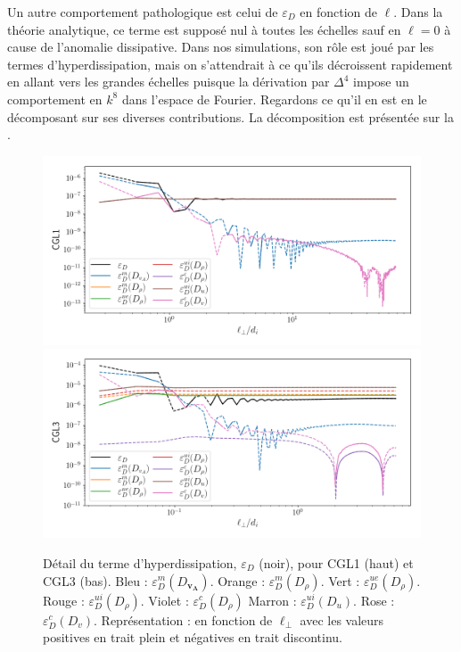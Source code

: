    Un autre comportement pathologique est celui de $\varepsilon_{D}$ en fonction de $\ell$. Dans la théorie analytique, ce terme est supposé nul à toutes les échelles sauf en $\ell = 0$ à cause de l'anomalie dissipative. Dans nos simulations, son rôle est joué par les termes d'hyperdissipation, mais on s'attendrait à ce qu'ils décroissent rapidement en allant vers les grandes échelles puisque la dérivation par $\Delta^4$ impose un comportement en $k^8$ dans l'espace de Fourier. Regardons ce qu'il en est en le décomposant sur ses diverses contributions. La décomposition est présentée sur la . 
 \begin{figure}[!ht]
  \centering
 \includegraphics[width=0.9\linewidth,trim=0cm 0cm 0cm 0cm, clip=true]{./Mainmatter/Part_3/images_ch2/CGL1_1D_lperp_dissl}
 \includegraphics[width=0.9\linewidth,trim=0cm 0cm 0cm 0.5cm, clip=true]{./Mainmatter/Part_3/images_ch2/CGL3_1D_lperp_dissl}
 \cprotect\caption{Détail du terme d'hyperdissipation, $\varepsilon_{D}$ (noir), pour CGL1 (haut) et CGL3 (bas). Bleu : $\varepsilon^m_{D}(D_{\boldsymbol{v_A}})$. Orange :  $\varepsilon^m_{D}(D_{\rho})$. Vert :  $\varepsilon^{ue}_{D}(D_{\rho})$. Rouge : $\varepsilon^{ui}_{D}(D_{\rho})$. Violet :  $\varepsilon^c_{D}(D_{\rho})$ Marron :  $\varepsilon^{ui}_{D}(D_{u})$. Rose :  $\varepsilon^c_{D}(D_{v})$. Représentation :  en fonction de $\ell_{\perp}$ avec les valeurs positives en trait plein et négatives en trait discontinu.}
 \label{fig:DISS}
 \end{figure}
